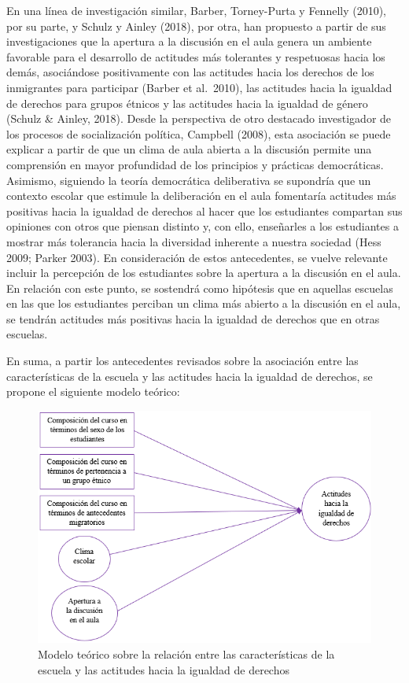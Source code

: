 \documentclass[12pt,twoside]{templates/facsothesis}
\begin{document}
En una línea de investigación similar, Barber, Torney-Purta y Fennelly (2010), por su parte, y Schulz y Ainley (2018), por otra, han propuesto a partir de sus investigaciones que la apertura a la discusión en el aula genera un ambiente favorable para el desarrollo de actitudes más tolerantes y respetuosas hacia los demás, asociándose positivamente con las actitudes hacia los derechos de los inmigrantes para participar (Barber et al.~2010), las actitudes hacia la igualdad de derechos para grupos étnicos y las actitudes hacia la igualdad de género (Schulz \& Ainley, 2018). Desde la perspectiva de otro destacado investigador de los procesos de socialización política, Campbell (2008), esta asociación se puede explicar a partir de que un clima de aula abierta a la discusión permite una comprensión en mayor profundidad de los principios y prácticas democráticas. Asimismo, siguiendo la teoría democrática deliberativa se supondría que un contexto escolar que estimule la deliberación en el aula fomentaría actitudes más positivas hacia la igualdad de derechos al hacer que los estudiantes compartan sus opiniones con otros que piensan distinto y, con ello, enseñarles a los estudiantes a mostrar más tolerancia hacia la diversidad inherente a nuestra sociedad (Hess 2009; Parker 2003). En consideración de estos antecedentes, se vuelve relevante incluir la percepción de los estudiantes sobre la apertura a la discusión en el aula. En relación con este punto, se sostendrá como hipótesis que en aquellas escuelas en las que los estudiantes perciban un clima más abierto a la discusión en el aula, se tendrán actitudes más positivas hacia la igualdad de derechos que en otras escuelas.

En suma, a partir los antecedentes revisados sobre la asociación entre las características de la escuela y las actitudes hacia la igualdad de derechos, se propone el siguiente modelo teórico:

\begin{figure}

{\centering \includegraphics[width=0.9\linewidth]{input/images/modelo_2} 

}

\caption{Modelo teórico sobre la relación entre las características de la escuela y las actitudes hacia la igualdad de derechos}\label{fig:unnamed-chunk-3}
\end{figure}
\end{document}
